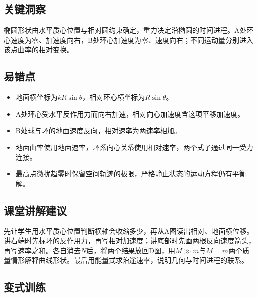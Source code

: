 \documentclass[UTF8,fontset=fandol,a4paper,11pt]{ctexart}
\begin{document}

\subsection*{关键洞察}

椭圆形状由水平质心位置与相对圆约束确定，重力决定沿椭圆的时间进程。A处环心速度为零、加速度向右，B处环心加速度为零、速度向右；不同运动量分别进入该点曲率的相对变换。



\subsection*{易错点}

\begin{itemize}
\item 地面横坐标为$kR\sin\theta$，相对环心横坐标为$R\sin\theta$。
\item A处环心受水平反作用力而向右加速，相对向心加速度含这项平移加速度。
\item B处球与环的地面速度反向，相对速率为两速率相加。
\item 地面曲率使用地面速率，环系向心关系使用相对速率，两个式子通过同一受力连接。
\item 最高点微扰趋零时保留空间轨迹的极限，严格静止状态的运动方程仍有平衡解。\end{itemize}



\subsection*{课堂讲解建议}

先让学生用水平质心位置判断横轴会收缩多少，再从A图读出相对、地面横位移。讲右端时先标环的反作用力，再写相对加速度；讲底部时先画两根反向速度箭头，再写速率之和。各自消去$N$后，将两个结果放回D图，用$M\gg m$与$M=m$两个质量情形解释曲线形状。最后用能量式求沿途速率，说明几何与时间进程的联系。



\subsection*{变式训练}
\end{document}
